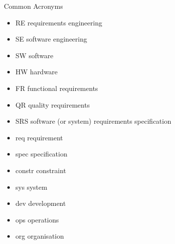 
\begin{Slide}{Common Acronyms}
\begin{itemize}
\item RE   \hfill requirements engineering
\item SE   \hfill software engineering
\item SW   \hfill software
\item HW   \hfill hardware
\item FR   \hfill functional requirements
\item QR   \hfill quality requirements
\item SRS  \hfill software (or system) requirements specification
\item req  \hfill requirement 
\item spec \hfill specification
\item constr \hfill constraint
\item sys  \hfill system
\item dev  \hfill development
\item ops  \hfill operations
\item org  \hfill organisation




\end{itemize}
\end{Slide}
